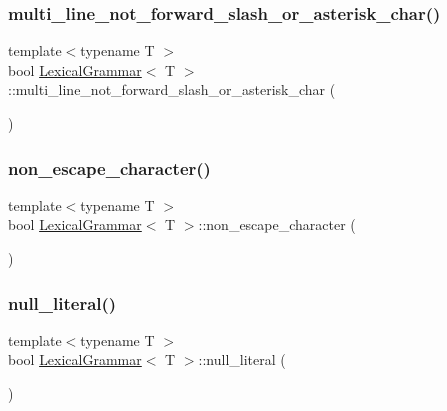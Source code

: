 \subsubsection{\texorpdfstring{multi\+\_\+line\+\_\+not\+\_\+forward\+\_\+slash\+\_\+or\+\_\+asterisk\+\_\+char()}{multi\_line\_not\_forward\_slash\_or\_asterisk\_char()}}
{\footnotesize\ttfamily template$<$typename T $>$ \\
bool \hyperlink{class_lexical_grammar}{Lexical\+Grammar}$<$ T $>$\+::multi\+\_\+line\+\_\+not\+\_\+forward\+\_\+slash\+\_\+or\+\_\+asterisk\+\_\+char (\begin{DoxyParamCaption}{ }\end{DoxyParamCaption})\hspace{0.3cm}{\ttfamily [inline]}}

\mbox{\label{class_lexical_grammar_a6c3dc0efec370cfadc61e11ae53af449}} 
\subsubsection{\texorpdfstring{non\+\_\+escape\+\_\+character()}{non\_escape\_character()}}
{\footnotesize\ttfamily template$<$typename T $>$ \\
bool \hyperlink{class_lexical_grammar}{Lexical\+Grammar}$<$ T $>$\+::non\+\_\+escape\+\_\+character (\begin{DoxyParamCaption}{ }\end{DoxyParamCaption})\hspace{0.3cm}{\ttfamily [inline]}}

\mbox{\label{class_lexical_grammar_a2bd963802a60b5d0e1476bdf3019494b}} 
\subsubsection{\texorpdfstring{null\+\_\+literal()}{null\_literal()}}
{\footnotesize\ttfamily template$<$typename T $>$ \\
bool \hyperlink{class_lexical_grammar}{Lexical\+Grammar}$<$ T $>$\+::null\+\_\+literal (\begin{DoxyParamCaption}{ }\end{DoxyParamCaption})\hspace{0.3cm}{\ttfamily [inline]}}

